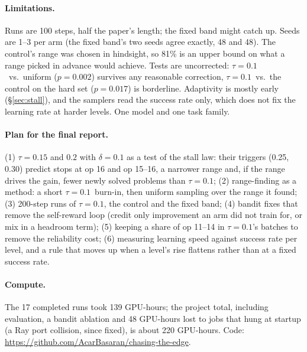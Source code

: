 \documentclass[11pt]{article}
\newcommand{\tauone}{$\tau{=}0.1$}
\begin{document}
\paragraph{Limitations.} Runs are 100 steps, half the paper's length; the fixed band might catch up. Seeds
are 1--3 per arm (the fixed band's two seeds agree exactly, 48 and 48). The control's range was chosen in
hindsight, so 81\% is an upper bound on what a range picked in advance would achieve. Tests are uncorrected:
\tauone\ vs.\ uniform ($p=0.002$) survives any reasonable correction, \tauone\ vs.\ the control on the hard
set ($p=0.017$) is borderline. Adaptivity is mostly early (\S\ref{sec:stall}), and the samplers read the
success rate only, which does not fix the learning rate at harder levels. One model and one task family.

\paragraph{Plan for the final report.} (1) $\tau=0.15$ and $0.2$ with $\delta=0.1$ as a test of the stall law: their
triggers (0.25, 0.30) predict stops at op 16 and op 15--16, a narrower range and, if the range drives the gain,
fewer newly solved problems than \tauone; (2) range-finding as a method: a short \tauone\ burn-in, then uniform sampling over
the range it found; (3) 200-step runs of \tauone, the control and the fixed band; (4) bandit fixes that
remove the self-reward loop (credit only improvement an arm did not train for, or mix in a headroom term);
(5) keeping a share of op 11--14 in \tauone's batches to remove the reliability cost; (6) measuring learning
speed against success rate per level, and a rule that moves up when a level's rise flattens rather than at a
fixed success rate.

\paragraph{Compute.} The 17 completed runs took 139 GPU-hours; the project total, including evaluation,
a bandit ablation and 48 GPU-hours lost to jobs that hung at startup (a Ray port collision, since fixed), is
about 220 GPU-hours. Code: \url{https://github.com/AcarBasaran/chasing-the-edge}.


\end{document}
